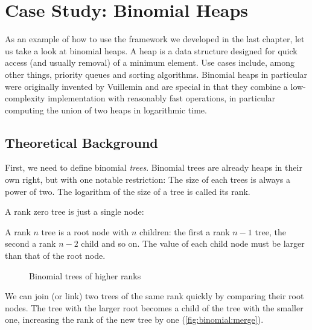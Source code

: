 
\chapter{Case Study: Binomial Heaps}
\label{ch:casestudyamortized}
As an example of how to use the framework we developed in the last chapter, let us take a look at binomial heaps. A heap is a data structure designed for quick access (and usually removal) of a minimum element. Use cases include, among other things, priority queues and sorting algorithms. Binomial heaps in particular were originally invented by Vuillemin \cite{vuillemin:1978:binheaps} and are special in that they combine a low-complexity implementation with reasonably fast operations, in particular computing the union of two heaps in logarithmic time.

\section{Theoretical Background}
First, we need to define binomial \emph{trees}. Binomial trees are already heaps in their own right, but with one notable restriction: The size of each trees is always a power of two. The logarithm of the size of a tree is called its rank.

A rank zero tree is just a single node:

\begin{figure}[h]
\begin{center}
    
\end{center}
\end{figure}

A rank $n$ tree is a root node with $n$ children: the first a rank $n-1$ tree, the second a rank $n-2$ child and so on. The value of each child node must be larger than that of the root node.

\begin{figure}[h]
\begin{center}
    
\end{center}
\caption{Binomial trees of higher ranks}
\label{fig:binomial:rankn}
\end{figure}

We can join (or link) two trees of the same rank quickly by comparing their root nodes. The tree with the larger root becomes a child of the tree with the smaller one, increasing the rank of the new tree by one (\autoref{fig:binomial:merge}).

